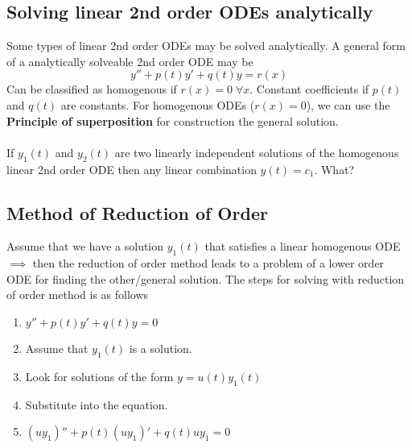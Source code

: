 \documentclass[a6paper]{article}
\theoremstyle{definition}
\theoremstyle{plain}
\theoremstyle{remark}
\begin{document}
\subsection{Solving linear 2nd order ODEs analytically}
Some types of linear 2nd order ODEs may be solved analytically. A general form
of a analytically solveable 2nd order ODE may be
$$ y'' + p(t) y' + q(t) y = r(x) $$
Can be classified as homogenous if $ r(x) = 0 \; \forall x $. Constant
coefficients if $ p(t)  $ and $ q(t) $ are constants. For homogenous ODEs
($ r(x) = 0 $), we can use the \textbf{Principle of superposition} for
construction the general solution.
\\\\
If $ y_1(t) $ and $ y_2(t) $ are two linearly independent solutions of the
homogenous linear 2nd order ODE then any linear combination $ y(t) = c_1 $.
What?
\subsection{Method of Reduction of Order}
Assume that we have a solution $ y_1(t) $ that satisfies a linear homogenous
ODE $ \implies $ then the reduction of order method leads to a problem of
a lower order ODE for finding the other/general solution. The steps for solving
with reduction of order method is as follows
\begin{enumerate}
  \item $ y'' + p(t) y' + q(t) y = 0 $
  \item Assume that $ y_1 (t) $ is a solution.
  \item Look for solutions of the form $ y = u(t)y_1(t) $
  \item Substitute into the equation.
  \item $ (u y_1)'' + p(t) (u y_1)' + q(t) u y_1 = 0 $
\end{enumerate}
\end{document}

